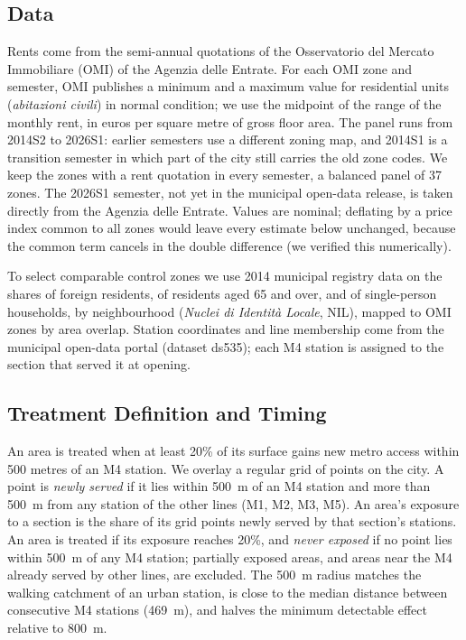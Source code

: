 \subsection*{Data}

Rents come from the semi-annual quotations of the Osservatorio del Mercato Immobiliare (OMI) of the Agenzia delle Entrate. For each OMI zone and semester, OMI publishes a minimum and a maximum value for residential units (\textit{abitazioni civili}) in normal condition; we use the midpoint of the range of the monthly rent, in euros per square metre of gross floor area. The panel runs from 2014S2 to 2026S1: earlier semesters use a different zoning map, and 2014S1 is a transition semester in which part of the city still carries the old zone codes. We keep the zones with a rent quotation in every semester, a balanced panel of 37 zones. The 2026S1 semester, not yet in the municipal open-data release, is taken directly from the Agenzia delle Entrate. Values are nominal; deflating by a price index common to all zones would leave every estimate below unchanged, because the common term cancels in the double difference (we verified this numerically).

To select comparable control zones we use 2014 municipal registry data on the shares of foreign residents, of residents aged 65 and over, and of single-person households, by neighbourhood (\textit{Nuclei di Identit\`a Locale}, NIL), mapped to OMI zones by area overlap. Station coordinates and line membership come from the municipal open-data portal (dataset ds535); each M4 station is assigned to the section that served it at opening.

\subsection*{Treatment Definition and Timing}

An area is treated when at least 20\% of its surface gains new metro access within 500 metres of an M4 station. We overlay a regular grid of points on the city. A point is \textit{newly served} if it lies within 500~m of an M4 station and more than 500~m from any station of the other lines (M1, M2, M3, M5). An area's exposure to a section is the share of its grid points newly served by that section's stations. An area is treated if its exposure reaches 20\%, and \textit{never exposed} if no point lies within 500~m of any M4 station; partially exposed areas, and areas near the M4 already served by other lines, are excluded. The 500~m radius matches the walking catchment of an urban station, is close to the median distance between consecutive M4 stations (469~m), and halves the minimum detectable effect relative to 800~m.

